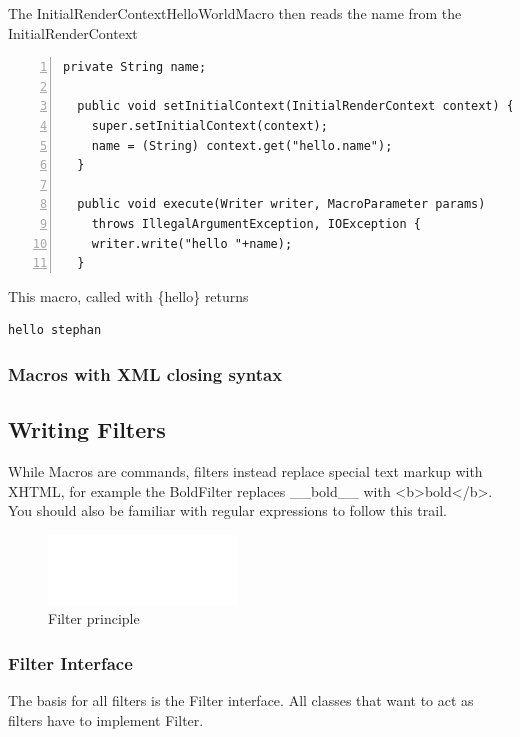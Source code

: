 \documentclass[a4paper,pdftex]{article}
\begin{document}
The InitialRenderContextHelloWorldMacro then reads the name from the InitialRenderContext

\begin{Verbatim}[gobble=2,frame=single,numbers=left,fontsize=\small]
  private String name;

  public void setInitialContext(InitialRenderContext context) {
    super.setInitialContext(context);
    name = (String) context.get("hello.name");
  }

  public void execute(Writer writer, MacroParameter params)
    throws IllegalArgumentException, IOException {
    writer.write("hello "+name);
  }
\end{Verbatim}

This macro, called with \{hello\} returns 

\begin{verbatim}
hello stephan
\end{verbatim}

\subsubsection{Macros with XML closing syntax}

\subsection{Writing Filters}

While Macros are commands, filters instead replace special text markup with XHTML, for example the BoldFilter replaces \_\_bold\_\_ with <b>bold</b>. 
You should also be familiar with regular expressions\cite{Friedl} to follow this trail.

\begin{figure}[ht]
    \centering
    \includegraphics[keepaspectratio,width=5cm]{images/Filter}
     \caption{\small\textsf Filter principle}
\end{figure}

\subsubsection{Filter Interface}

The basis for all filters is the Filter interface. All classes that want to act as filters have to implement Filter.
\end{document}
